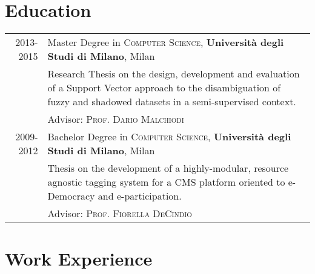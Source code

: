 \documentclass[a4paper,10pt]{article} %
\begin{document}
\section{Education}

\begin{tabular}{rp{11cm}}	
\textsc{2013-2015} & Master Degree in \textsc{Computer Science}, \textbf{Università degli Studi di Milano}, Milan\\
& \footnotesize{Research Thesis on the design, development and evaluation of a Support Vector approach to the  disambiguation of fuzzy and shadowed datasets in a semi-supervised context.} \\ &\small Advisor: \textsc{Prof. Dario Malchiodi} \\

	
\textsc{2009-2012} & Bachelor Degree in \textsc{Computer Science}, \textbf{Università degli Studi di Milano}, Milan\\
& \footnotesize{Thesis on the development of a highly-modular, resource agnostic tagging system for a CMS platform oriented to e-Democracy and e-participation.} \\ &\small Advisor: \textsc{Prof. Fiorella DeCindio}
\end{tabular}



\section{Work Experience}
\end{document}
